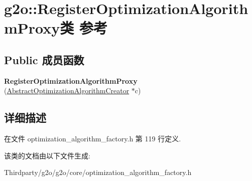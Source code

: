 \hypertarget{classg2o_1_1RegisterOptimizationAlgorithmProxy}{\section{g2o\-:\-:Register\-Optimization\-Algorithm\-Proxy类 参考}
\label{classg2o_1_1RegisterOptimizationAlgorithmProxy}
}
\subsection*{Public 成员函数}
\begin{DoxyCompactItemize}
\item 
\hypertarget{classg2o_1_1RegisterOptimizationAlgorithmProxy_acf89c65d6156d53014e0dcafd388258c}{{\bfseries Register\-Optimization\-Algorithm\-Proxy} (\hyperlink{classg2o_1_1AbstractOptimizationAlgorithmCreator}{Abstract\-Optimization\-Algorithm\-Creator} $\ast$c)}\label{classg2o_1_1RegisterOptimizationAlgorithmProxy_acf89c65d6156d53014e0dcafd388258c}

\end{DoxyCompactItemize}


\subsection{详细描述}


在文件 optimization\-\_\-algorithm\-\_\-factory.\-h 第 119 行定义.



该类的文档由以下文件生成\-:\begin{DoxyCompactItemize}
\item 
Thirdparty/g2o/g2o/core/optimization\-\_\-algorithm\-\_\-factory.\-h\end{DoxyCompactItemize}
